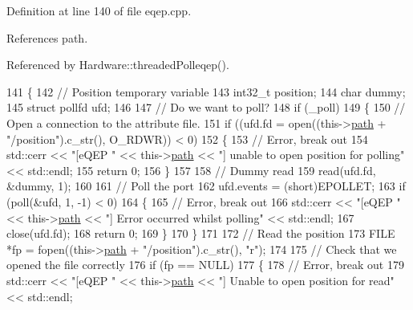 Definition at line 140 of file eqep.\+cpp.



References path.



Referenced by Hardware\+::threaded\+Polleqep().


\begin{DoxyCode}
141     \{
142         \textcolor{comment}{// Position temporary variable}
143         int32\_t       position;
144         \textcolor{keywordtype}{char}          dummy;
145         \textcolor{keyword}{struct }pollfd ufd;
146 
147         \textcolor{comment}{// Do we want to poll? }
148         \textcolor{keywordflow}{if} (\_poll)
149         \{
150             \textcolor{comment}{// Open a connection to the attribute file.}
151             \textcolor{keywordflow}{if} ((ufd.fd = open((this->\hyperlink{class_hardware_1_1e_q_e_p_a82718bc8478cde37f28fc685a859525e}{path} + \textcolor{stringliteral}{"/position"}).c\_str(), O\_RDWR)) < 0)
152             \{
153                 \textcolor{comment}{// Error, break out}
154                 std::cerr << \textcolor{stringliteral}{"[eQEP "} << this->\hyperlink{class_hardware_1_1e_q_e_p_a82718bc8478cde37f28fc685a859525e}{path} << \textcolor{stringliteral}{"] unable to open position for polling"} << 
      std::endl;
155                 \textcolor{keywordflow}{return} 0;
156             \}
157 
158             \textcolor{comment}{// Dummy read}
159             read(ufd.fd, &dummy, 1);
160 
161             \textcolor{comment}{// Poll the port}
162             ufd.events = (short)EPOLLET;
163             \textcolor{keywordflow}{if} (poll(&ufd, 1, -1) < 0)
164             \{
165                 \textcolor{comment}{// Error, break out}
166                 std::cerr << \textcolor{stringliteral}{"[eQEP "} << this->\hyperlink{class_hardware_1_1e_q_e_p_a82718bc8478cde37f28fc685a859525e}{path} << \textcolor{stringliteral}{"] Error occurred whilst polling"} << std::endl;
167                 close(ufd.fd);
168                 \textcolor{keywordflow}{return} 0;
169             \}
170         \}
171 
172         \textcolor{comment}{// Read the position}
173         FILE *fp = fopen((this->\hyperlink{class_hardware_1_1e_q_e_p_a82718bc8478cde37f28fc685a859525e}{path} + \textcolor{stringliteral}{"/position"}).c\_str(), \textcolor{stringliteral}{"r"});
174 
175         \textcolor{comment}{// Check that we opened the file correctly}
176         \textcolor{keywordflow}{if} (fp == NULL)
177         \{
178             \textcolor{comment}{// Error, break out}
179             std::cerr << \textcolor{stringliteral}{"[eQEP "} << this->\hyperlink{class_hardware_1_1e_q_e_p_a82718bc8478cde37f28fc685a859525e}{path} << \textcolor{stringliteral}{"] Unable to open position for read"} << std::endl;

\end{DoxyCode}
